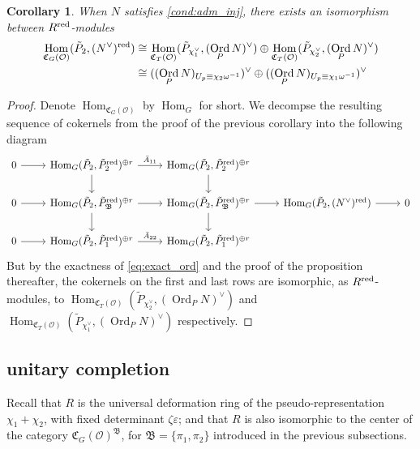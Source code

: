 \documentclass[leqno]{amsart}
\DeclareMathOperator{\Ord}{Ord}
\newcommand{\red}{\textnormal{red}}
\newcommand{\oo}{\mathcal O}
\newcommand{\1}{\mathbf{1}}
\newcommand{\fC}{\mathfrak C}
\newcommand{\B}{\mathfrak B}
\DeclareMathOperator{\Hom}{Hom}
\newtheorem{cor}[thm]{Corollary}
\theoremstyle{definition}
\theoremstyle{remark}
\begin{document}
\begin{cor}
	When $N$ satisfies \eqref{cond:adm_inj}, 
	there exists an isomorphism between $R^{\red}$-modules
    \begin{align}
	    \Hom_{\fC_{G}(\oo)}(\tilde{P}_2,(N^\vee)^{\red})
	    &\cong
	    \Hom_{\fC_{T}(\oo)}(\tilde{P}_{\chi_1^\vee}, (\Ord_PN)^\vee)\oplus
	    \Hom_{\fC_{T}(\oo)}(\tilde{P}_{\chi_2^\vee},(\Ord_PN)^\vee)\\
	    &\cong
	    ((\Ord_PN)_{U_p\equiv \chi_2\omega^{-1}})^\vee\oplus
	    ((\Ord_PN)_{U_p\equiv \chi_1\omega^{-1}})^\vee
    \end{align}
\end{cor}
\begin{proof}
	Denote $\Hom_{\fC_{G}(\oo)}$ by $\Hom_G$ for short.
	We decompse the resulting sequence of cokernels
	from the proof of the previous corollary into the following diagram
\begin{equation*}
    \begin{tikzcd}
	    0 \arrow[r]& \Hom_{G}(\tilde{P}_2, \tilde{P}_2^{\red})^{\oplus r}
	    \arrow[r,"\bar{A}_{11}"] \arrow[d]&
	    \Hom_{G}(\tilde{P}_2, \tilde{P}_2^{\red})^{\oplus r}
	    \arrow[d] &&\\
	    0\arrow[r] & \Hom_{G}(\tilde{P}_2, \tilde{P}_\B^{\red})^{\oplus r}
	    \arrow[r] 
	    \arrow[d] &
	    \Hom_{G}(\tilde{P}_2, \tilde{P}_\B^{\red})^{\oplus r}
	    \arrow[d] \arrow[r]&
	    \Hom_{G}(\tilde{P}_2, (N^\vee)^{\red})\arrow[r]&0\\
	    0\arrow[r] & \Hom_{G}(\tilde{P}_2, \tilde{P}_1^{\red})^{\oplus r}
	    \arrow[r,"\bar{A}_{22}"] &
	    \Hom_{G}(\tilde{P}_2, \tilde{P}_1^{\red})^{\oplus r}&&
    \end{tikzcd}
\end{equation*}
But by the exactness of \eqref{eq:exact_ord}
and the proof of the proposition thereafter,
the cokernels on the first and last rows
are isomorphic, as  $R^{\red}$-modules,
to $\Hom_{\fC_T(\oo)}(\tilde{P}_{\chi_2^\vee}, (\Ord_PN)^\vee)$ and
$\Hom_{\fC_T(\oo)}(\tilde{P}_{\chi_1^\vee}, (\Ord_PN)^\vee)$ respectively.
\end{proof}  

\subsection{unitary completion}

Recall that $R$ is the universal deformation ring
of the pseudo-representation
$\chi_1+\chi_2$, with fixed determinant  $\zeta\varepsilon$;
and that  $R$
is also isomorphic to the center
of the category  $\fC_G(\oo)^\B$,
for  $\B=\{\pi_1,\pi_2\}$ 
introduced in the previous subsections.
\end{document}
